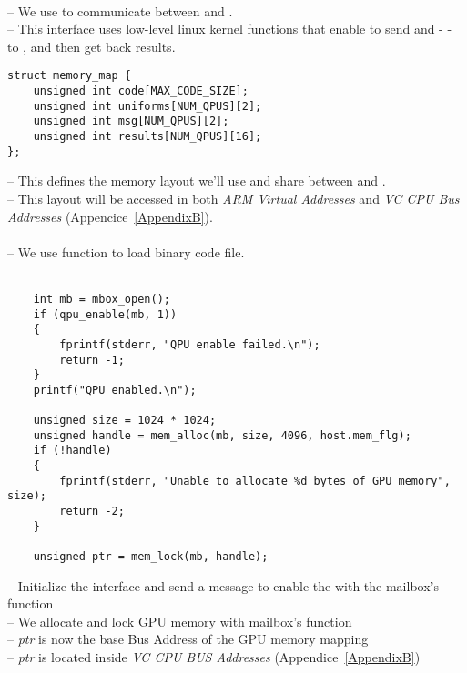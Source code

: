 \\
-- We use  to communicate between \vc{} and \cpu.\\
-- This interface uses low-level linux kernel functions that enable  to send  and  -  - to , and then get back results.\\



\begin{lstlisting}
struct memory_map {
    unsigned int code[MAX_CODE_SIZE];
    unsigned int uniforms[NUM_QPUS][2];
    unsigned int msg[NUM_QPUS][2];
    unsigned int results[NUM_QPUS][16];
};
\end{lstlisting}
-- This defines the memory layout we’ll use and share between  and .\\
-- This layout will be accessed in both \emph{ARM Virtual Addresses} and \emph{VC CPU Bus Addresses} (Appencice~\ref{AppendixB}).\\

\\
-- We use  function to load  binary code file.\\~\\

\begin{lstlisting}
    int mb = mbox_open();
    if (qpu_enable(mb, 1))
    {
        fprintf(stderr, "QPU enable failed.\n");
        return -1;
    }
    printf("QPU enabled.\n");

    unsigned size = 1024 * 1024;
    unsigned handle = mem_alloc(mb, size, 4096, host.mem_flg);
    if (!handle)
    {
        fprintf(stderr, "Unable to allocate %d bytes of GPU memory", size);
        return -2;
    }

    unsigned ptr = mem_lock(mb, handle);
\end{lstlisting}

-- Initialize the  interface and send a message to enable the \qpu{} with the  mailbox's function\\
-- We allocate and lock GPU memory with  mailbox's function\\
-- \emph{ptr} is now the base Bus Address of the GPU memory mapping\\
-- \emph{ptr} is located inside \emph{VC CPU BUS Addresses} (Appendice~\ref{AppendixB})\\

